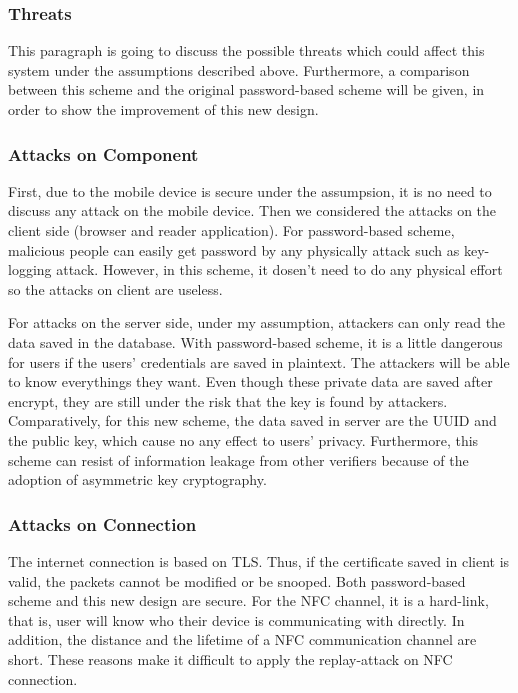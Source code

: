 \begin{CJK}{Bg5}{bsmi}
\subsubsection{Threats}

This paragraph is going to discuss the possible threats which could affect this system under the assumptions described above. Furthermore, a comparison between this scheme and the original password-based scheme will be given, in order to show the improvement of this new design.

\subsubsection{Attacks on Component}

First, due to the mobile device is secure under the assumpsion, it is no need to discuss any attack on the mobile device. Then we considered the attacks on the client side (browser and reader application). For password-based scheme, malicious people can easily get password by any physically attack such as key-logging attack. However, in this scheme, it dosen't need to do any physical effort so the attacks on client are useless.

For attacks on the server side, under my assumption, attackers can only read the data saved in the database. With password-based scheme, it is a little dangerous for users if the users' credentials are saved in plaintext. The attackers will be able to know everythings they want. Even though these private data are saved after encrypt, they are still under the risk that the key is found by attackers. Comparatively, for this new scheme, the data saved in server are the UUID and the public key, which cause no any effect to users' privacy. Furthermore, this scheme can resist of information leakage from other verifiers because of the adoption of asymmetric key cryptography.

\subsubsection{Attacks on Connection}

The internet connection is based on TLS. Thus, if the certificate saved in client is valid, the packets cannot be modified or be snooped. Both password-based scheme and this new design are secure. For the NFC channel, it is a hard-link, that is, user will know who their device is communicating with directly. In addition, the distance and the lifetime of a NFC communication channel are short. These reasons make it difficult to apply the replay-attack on NFC connection. 


\end{CJK}
